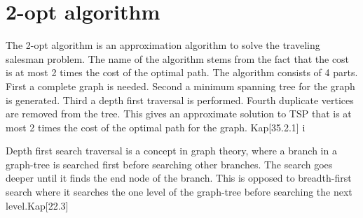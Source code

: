 

\section{2-opt algorithm}
The 2-opt algorithm is an approximation algorithm to solve the traveling salesman problem. The name of the algorithm stems from the fact that the cost is at most 2 times the cost of the optimal path. 
The algorithm consists of 4 parts. First a complete graph is needed. Second a minimum spanning tree for the graph is generated. Third a depth first traversal is performed. Fourth duplicate vertices are removed from the tree.
This gives an approximate solution to TSP that is at most 2 times the cost of the optimal path for the graph. Kap[35.2.1] i \cite{cormen2009introduction}

Depth first search traversal is a concept in graph theory, where a branch in a graph-tree is searched first before searching other branches. The search goes deeper until it finds the end node of the branch. This is opposed to breadth-first search where it searches the one level of the graph-tree before searching the next level.Kap[22.3] \cite{cormen2009introduction}



